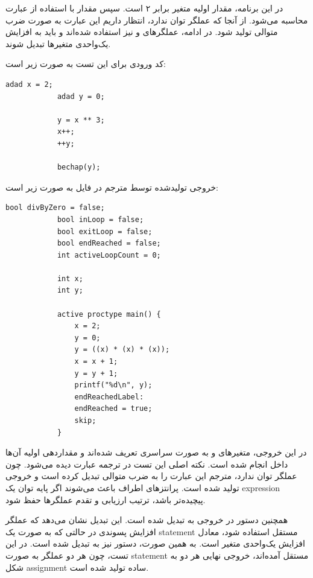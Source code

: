 \documentclass[12pt]{report}
\begin{document}
	
	در این برنامه، مقدار اولیه متغیر  برابر ۲ است. 
	سپس مقدار  با استفاده از عبارت  محاسبه می‌شود. 
	از آنجا که  عملگر توان ندارد، انتظار داریم این عبارت به صورت ضرب متوالی  تولید شود. 
	در ادامه، عملگرهای  و  نیز استفاده شده‌اند و باید به افزایش یک‌واحدی متغیرها تبدیل شوند.
	
	کد ورودی  برای این تست به صورت زیر است:
	
	\begin{latin}
		\begin{lstlisting}[style=hashstyle]
			adad x = 2;
			adad y = 0;
			
			y = x ** 3;
			x++;
			++y;
			
			bechap(y);
		\end{lstlisting}
	\end{latin}
	
	خروجی تولیدشده توسط مترجم در فایل  به صورت زیر است:
	
	\begin{latin}
		\begin{lstlisting}[style=codestyle]
			bool divByZero = false;
			bool inLoop = false;
			bool exitLoop = false;
			bool endReached = false;
			int activeLoopCount = 0;
			
			int x;
			int y;
			
			active proctype main() {
				x = 2;
				y = 0;
				y = ((x) * (x) * (x));
				x = x + 1;
				y = y + 1;
				printf("%d\n", y);
				endReachedLabel:
				endReached = true;
				skip;
			}
		\end{lstlisting}
	\end{latin}
	
	در این خروجی، متغیرهای  و  به صورت سراسری تعریف شده‌اند و مقداردهی اولیه آن‌ها داخل  انجام شده است. 
	نکته اصلی این تست در ترجمه عبارت  دیده می‌شود. 
	چون  عملگر توان ندارد، مترجم این عبارت را به ضرب متوالی تبدیل کرده است و خروجی  تولید شده است. 
	پرانتزهای اطراف  باعث می‌شوند اگر پایه توان یک expression پیچیده‌تر باشد، ترتیب ارزیابی و تقدم عملگرها حفظ شود.
	
	همچنین دستور  در خروجی به  تبدیل شده است. 
	این تبدیل نشان می‌دهد که عملگر افزایش پسوندی در حالتی که به صورت یک statement مستقل استفاده شود، معادل افزایش یک‌واحدی متغیر است. 
	به همین صورت، دستور  نیز به  تبدیل شده است. 
	در این تست، چون هر دو عملگر به صورت statement مستقل آمده‌اند، خروجی نهایی هر دو به شکل assignment ساده تولید شده است.
	
\end{document}
